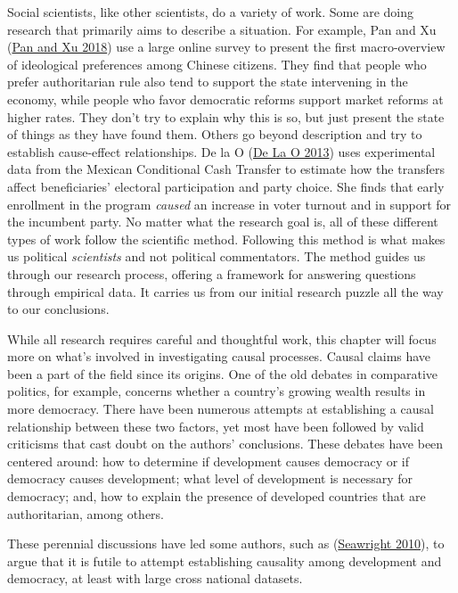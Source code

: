 \documentclass{book}
\begin{document}
Social scientists, like other scientists, do a variety of work. Some are doing
research that primarily aims to describe a situation. For example, Pan and Xu
(\protect\hyperlink{ref-panChinaIdeologicalSpectrum2018}{Pan and Xu 2018}) use
a large online survey to present the first macro-overview of ideological
preferences among Chinese citizens. They find that people who prefer
authoritarian rule also tend to support the state intervening in the economy,
while people who favor democratic reforms support market reforms at higher
rates. They don't try to explain why this is so, but just present the state of
things as they have found them. Others go beyond description and try to
establish cause-effect relationships. De la O
(\protect\hyperlink{ref-delao2013}{De La O 2013}) uses experimental data from
the Mexican Conditional Cash Transfer to estimate how the transfers affect
beneficiaries' electoral participation and party choice. She finds that early
enrollment in the program \emph{caused} an increase in voter turnout and in
support for the incumbent party. No matter what the research goal is, all of
these different types of work follow the scientific method. Following this
method is what makes us political \emph{scientists} and not political
commentators. The method guides us through our research process, offering a
framework for answering questions through empirical data. It carries us from
our initial research puzzle all the way to our conclusions.

While all research requires careful and thoughtful work, this chapter will
focus more on what's involved in investigating causal processes. Causal claims
have been a part of the field since its origins. One of the old debates in
comparative politics, for example, concerns whether a country's growing wealth
results in more democracy. There have been numerous attempts at establishing a
causal relationship between these two factors, yet most have been followed by
valid criticisms that cast doubt on the authors' conclusions. These debates
have been centered around: how to determine if development causes democracy or
if democracy causes development; what level of development is necessary for
democracy; and, how to explain the presence of developed countries that are
authoritarian, among others.

These perennial discussions have led some authors, such as
(\protect\hyperlink{ref-seawright2010}{Seawright 2010}), to argue that it is
futile to attempt establishing causality among development and democracy, at
least with large cross national datasets.
\end{document}
